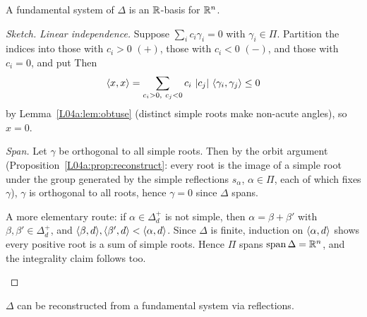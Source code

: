 \begin{theorem}\label{L04a:thm:basis}
A fundamental system of $\Delta$ is an $\mathbb{R}$-basis for $\mathbb{R}^n$.
\end{theorem}

\begin{proof}[Sketch]
\emph{Linear independence.} Suppose $\sum_i c_i\gamma_i = 0$ with $\gamma_i\in\Pi$. Partition the
indices into those with $c_i>0$ $(+)$, those with $c_i<0$ $(-)$, and those with $c_i=0$, and put
 Then
\[
  \ip{x}{x} = \sum_{c_i>0,\ c_j<0} c_i\,\abs{c_j}\,\ip{\gamma_i}{\gamma_j}\le 0
\]
by Lemma~\ref{L04a:lem:obtuse} (distinct simple roots make non-acute angles), so $x=0$.

\emph{Span.} Let $\gamma$ be orthogonal to all simple roots. Then by the orbit argument
(Proposition~\ref{L04a:prop:reconstruct}: every root is the image of a simple root under the group
generated by the simple reflections $s_\alpha$, $\alpha\in\Pi$, each of which fixes $\gamma$),
$\gamma$ is orthogonal to all roots, hence $\gamma=0$ since $\Delta$ spans.
\begin{addedblock}
A more elementary route: if $\alpha\in\Delta_d^+$ is not simple, then $\alpha=\beta+\beta'$ with
$\beta,\beta'\in\Delta_d^+$, and $\langle \beta, d\rangle,\langle \beta', d\rangle<\langle \alpha, d\rangle$. Since $\Delta$ is
finite, induction on $\langle \alpha, d\rangle$ shows every positive root is a sum of simple roots. Hence $\Pi$
spans $\operatorname{span}\Delta=\mathbb{R}^n$, and the integrality claim follows too.
\end{addedblock}
\end{proof}

\begin{proposition}\label{L04a:prop:reconstruct}
$\Delta$ can be reconstructed from a fundamental system via reflections.
\end{proposition}

